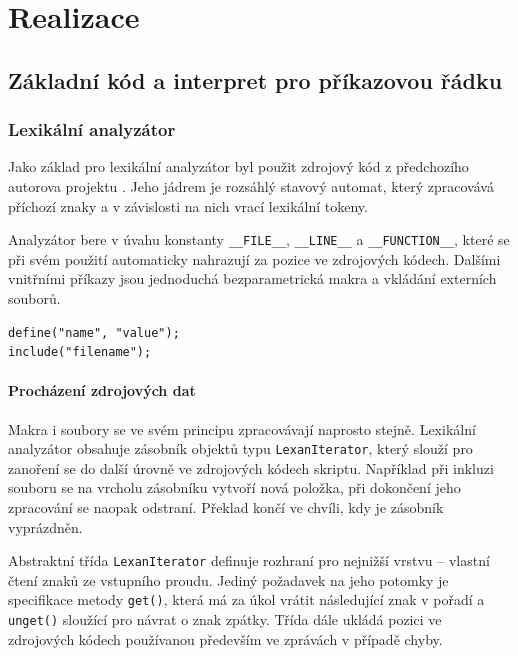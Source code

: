 \documentclass[11pt,twoside,a4paper]{book}
\begin{document}
\chapter{Realizace}


\section{Základní kód a interpret pro příkazovou řádku}

\subsection{Lexikální analyzátor}

Jako základ pro lexikální analyzátor byl použit zdrojový kód z předchozího autorova projektu \cite[třída \texttt{CLexan}]{borsch}. Jeho jádrem je rozsáhlý stavový automat, který zpracovává příchozí znaky a v závislosti na nich vrací lexikální tokeny.

Analyzátor bere v úvahu konstanty \texttt{\_\_FILE\_\_}, \texttt{\_\_LINE\_\_} a \texttt{\_\_FUNCTION\_\_}, které se při svém použití automaticky nahrazují za pozice ve zdrojových kódech. Dalšími vnitřními příkazy jsou jednoduchá bezparametrická makra a vkládání externích souborů.

\begin{verbatim}
define("name", "value");
include("filename");
\end{verbatim}


\subsubsection{Procházení zdrojových dat}

Makra i soubory se ve svém principu zpracovávají naprosto stejně. Lexikální analyzátor obsahuje zásobník objektů typu \texttt{LexanIterator}, který slouží pro zanoření se do další úrovně ve zdrojových kódech skriptu. Například při inkluzi souboru se na vrcholu zásobníku vytvoří nová položka, při dokončení jeho zpracování se naopak odstraní. Překlad končí ve chvíli, kdy je zásobník vyprázdněn.

Abstraktní třída \texttt{LexanIterator} definuje rozhraní pro nejnižší vrstvu -- vlastní čtení znaků ze vstupního proudu. Jediný požadavek na jeho potomky je specifikace metody \texttt{get()}, která má za úkol vrátit následující znak v pořadí a \texttt{unget()} sloužící pro návrat o znak zpátky. Třída dále ukládá pozici ve zdrojových kódech používanou především ve zprávách v případě chyby.
\end{document}
